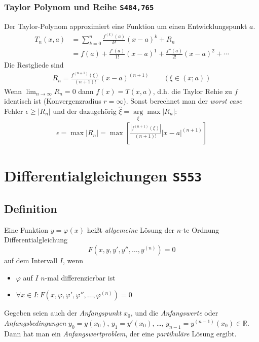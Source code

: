 \documentclass[margin=small, twocolumn]{hsrzf}
\numberwithin{equation}{subsection}
\newcommand{\brpage}[1]{\textcolor{red!70!black}{\small\texttt{S#1}}}
\begin{document}
\subsubsection{Taylor Polynom und Reihe \brpage{484,765}}
Der Taylor-Polynom approximiert eine Funktion um einen Entwicklungspunkt \(a\).
\begin{align*}
  T_n(x, a) &= \sum_{k=0}^n\frac{f^{(k)}(a)}{k!}(x-a)^k + R_n\\
  &= f(a) + \frac{f'(a)}{1!}(x-a)^1 + \frac{f''(a)}{2!}(x-a)^2 + \cdots
\end{align*}
Die Restgliede sind
\begin{align*}
  R_n = \frac{f^{(n+1)}(\xi)}{(n+1)!} (x-a)^{(n+1)} \qquad (\xi \in (x;a))
\end{align*}
Wenn \(\lim_{n\to\infty}R_n = 0\) dann \(f(x) = T(x,a)\), d.h. die Taylor Rehie zu \(f\) identisch ist (Konvergenzradius \(r = \infty\)). Sonst berechnet man der \emph{worst case} Fehler \(\epsilon \geq |R_n|\) und der dazugeh\"orig \(\hat{\xi} = \underset{\xi}{\arg}\max|R_n|\):
\begin{align*}
  \epsilon
  = \max |R_n|
  = \max \left[\frac{|f^{(n+1)}(\xi)|}{(n+1)!} |x-a|^{(n+1)}\right]
\end{align*}


\section{Differentialgleichungen \brpage{553}}
\subsection{Definition}
Eine Funktion \(y = \varphi(x)\) hei{\ss}t \emph{allgemeine} L\"osung der \(n\)-te Ordnung Differentialgleichung
\[
    F(x, y, y', y'', \dots, y^{(n)}) = 0
\]
auf dem Intervall \(I\), wenn
\begin{itemize}
    \item \(\varphi\) auf \(I\) \(n\)-mal differenzierbar ist
    \item \(\forall x \in I: F(x, \varphi, \varphi', \varphi'', \dots, \varphi^{(n)}) = 0\)
\end{itemize}

Gegeben seien auch der \emph{Anfangspunkt} \(x_0\), und
die \emph{Anfangswerte} oder \emph{Anfangsbedingungen}
\(y_0 = y(x_0)\),
\(y_1 = y'(x_0)\),
\dots,
\(y_{n-1} = y^{(n-1)}(x_0) \in \mathbb{R}\).
Dann hat man ein \emph{Anfangswertproblem}, der eine \emph{partikul\"are} L\"osung ergibt.
\end{document}
